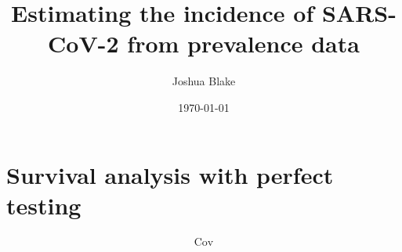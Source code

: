 \documentclass[a4paper]{report}
\title{Estimating the incidence of SARS-CoV-2 from prevalence data}
\author{Joshua Blake}
\date{\today}
\DeclareMathOperator{\cov}{Cov}
\begin{document}
\maketitle

\chapter{Survival analysis with perfect testing}



\begin{align}
    \cov
\end{align}
\end{document}
